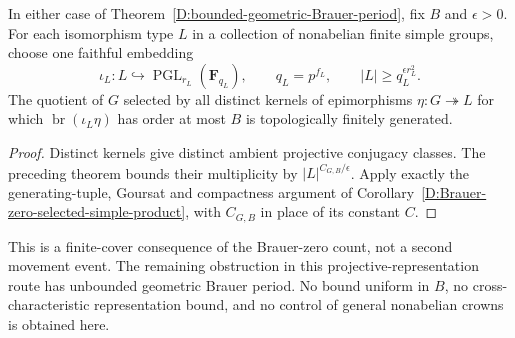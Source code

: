 \begin{corollary}
\label{D:bounded-Brauer-period-selected-simple-product}
In either case of Theorem~\ref{D:bounded-geometric-Brauer-period},
fix $B$ and $\epsilon>0$.  For each isomorphism type $L$ in
a collection of nonabelian finite simple groups, choose one
faithful embedding
\[
       \iota_L:L\hookrightarrow
                    \operatorname{PGL}_{r_L}(\mathbf F_{q_L}),
       \qquad q_L=p^{f_L},\qquad
                    |L|\ge q_L^{\epsilon r_L^2}.
\]
The quotient of $G$ selected by all distinct kernels of
epimorphisms $\eta:G\twoheadrightarrow L$ for which
$\operatorname{br}(\iota_L\eta)$ has order at most $B$
is topologically finitely generated.
\end{corollary}
\begin{proof}
Distinct kernels give distinct ambient projective conjugacy
classes.  The preceding theorem bounds their multiplicity
by $|L|^{C_{G,B}/\epsilon}$.  Apply exactly the generating-tuple,
Goursat and compactness argument of
Corollary~\ref{D:Brauer-zero-selected-simple-product}, with
$C_{G,B}$ in place of its constant $C$.
\end{proof}

\begin{remark}
This is a finite-cover consequence of the Brauer-zero count,
not a second movement event.  The remaining obstruction in
this projective-representation route has unbounded geometric
Brauer period.  No bound uniform in $B$, no cross-characteristic
representation bound, and no control of general nonabelian
crowns is obtained here.
\end{remark}
